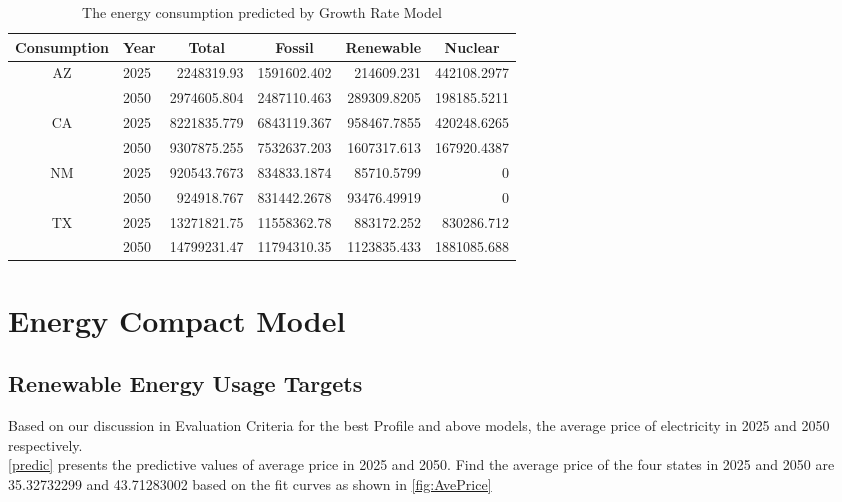 \documentclass{mcmthesis}
\begin{document}
\begin{table}[htbp]
	\centering
	\caption{The energy consumption predicted by Growth Rate Model}
	\label{my-label}
	\begin{tabular}{|c|l|r|r|r|r|}
		\hline
		Consumption         & \multicolumn{1}{c|}{Year} & \multicolumn{1}{c|}{Total} & \multicolumn{1}{c|}{Fossil} & \multicolumn{1}{c|}{Renewable} & \multicolumn{1}{c|}{Nuclear} \\ \hline
		\multirow{2}{*}{AZ} & 2025                      & 2248319.93                 & 1591602.402                 & 214609.231                     & 442108.2977                  \\ \cline{2-6} 
		& 2050                      & 2974605.804                & 2487110.463                 & 289309.8205                    & 198185.5211                  \\ \hline
		\multirow{2}{*}{CA} & 2025                      & 8221835.779                & 6843119.367                 & 958467.7855                    & 420248.6265                  \\ \cline{2-6} 
		& 2050                      & 9307875.255                & 7532637.203                 & 1607317.613                    & 167920.4387                  \\ \hline
		\multirow{2}{*}{NM} & 2025                      & 920543.7673                & 834833.1874                 & 85710.5799                     & 0                            \\ \cline{2-6} 
		& 2050                      & 924918.767                 & 831442.2678                 & 93476.49919                    & 0                            \\ \hline
		\multirow{2}{*}{TX} & 2025                      & 13271821.75                & 11558362.78                 & 883172.252                     & 830286.712                   \\ \cline{2-6} 
		& 2050                      & 14799231.47                & 11794310.35                 & 1123835.433                    & 1881085.688                  \\ \hline
	\end{tabular}
	\label{tab:GroPredict}%
\end{table}

\section{Energy Compact Model}
\subsection{Renewable Energy Usage Targets}Based on our discussion in Evaluation Criteria for the best Profile and above models, the average price of electricity in 2025 and 2050 respectively.\\
\autoref{predic} presents the predictive values of average price in 2025 and 2050. Find the average price of the four states in 2025 and 2050 are 35.32732299 and 43.71283002 based on the fit curves as shown in \autoref{fig:AvePrice}\\
\end{document}
